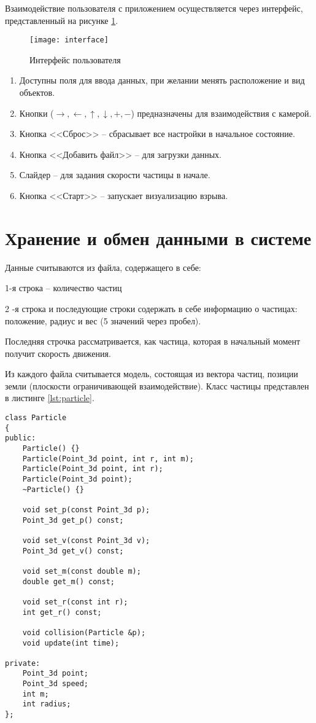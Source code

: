 Взаимодействие пользователя с приложением осуществляется через интерфейс, представленный на рисунке \ref{img:interface}. 

\begin{figure}[H]
	\centering
	\texttt{[image: interface]}
	\caption{Интерфейс пользователя}
	\label{img:interface}
\end{figure}

\begin{enumerate}
	\item Доступны поля для ввода данных, при желании менять расположение и вид объектов. 
	\item Кнопки ($\to, \leftarrow, \uparrow, \downarrow, +, -$) предназначены для взаимодействия с камерой. 
	\item Кнопка  <<Сброс>> -- сбрасывает все настройки в начальное состояние. 
	\item Кнопка <<Добавить файл>> -- для загрузки данных. 
	\item Слайдер -- для задания скорости частицы в начале. 
	\item Кнопка <<Старт>> -- запускает визуализацию взрыва.   
\end{enumerate}

\section{\textbf{Хранение и обмен данными в системе }}

Данные считываются из файла, содержащего в себе:

1-я строка -- количество частиц

2 -я строка и последующие строки содержать в себе информацию о частицах: положение, радиус и вес (5 значений через пробел). 

Последняя строчка рассматривается, как частица, которая в начальный момент получит скорость движения. 

Из каждого файла считывается модель, состоящая из вектора частиц, позиции земли (плоскости ограничивающей взаимодействие). Класс частицы представлен в листинге \ref{lst:particle}. 


\begin{lstlisting}[caption=Класс частицы, label = lst:particle, style=simplecode]
class Particle
{
public:
    Particle() {}
    Particle(Point_3d point, int r, int m);
    Particle(Point_3d point, int r);
    Particle(Point_3d point);
    ~Particle() {}

    void set_p(const Point_3d p);
    Point_3d get_p() const;

    void set_v(const Point_3d v);
    Point_3d get_v() const;

    void set_m(const double m);
    double get_m() const;

    void set_r(const int r);
    int get_r() const;

    void collision(Particle &p);
    void update(int time);

private:
    Point_3d point;
    Point_3d speed;
    int m;
    int radius;
};
\end{lstlisting}

